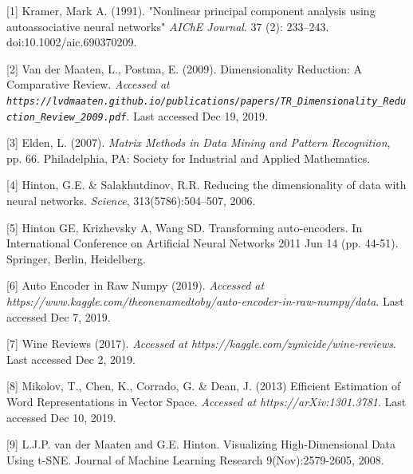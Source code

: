 \documentclass{article}
\begin{document}
[1] Kramer, Mark A. (1991). "Nonlinear principal component analysis using autoassociative neural networks" {\it AIChE Journal}. 37 (2): 233–243. doi:10.1002/aic.690370209.

[2] Van der Maaten, L., Postma, E. (2009). Dimensionality Reduction: A Comparative Review. {\it Accessed at \verb+https://lvdmaaten.github.io/publications/papers/TR_Dimensionality_Reduction_Review_2009.pdf+}. Last accessed Dec 19, 2019.

[3] Elden, L. (2007). {\it Matrix Methods in Data Mining and Pattern Recognition}, pp. 66. Philadelphia, PA:  Society for Industrial and Applied Mathematics.

[4] Hinton, G.E. \& Salakhutdinov, R.R. Reducing the dimensionality of data with neural networks. {\it Science}, 313(5786):504–507, 2006.

[5] Hinton GE, Krizhevsky A, Wang SD. Transforming auto-encoders. In International Conference on Artificial Neural Networks 2011 Jun 14 (pp. 44-51). Springer, Berlin, Heidelberg.

[6] Auto Encoder in Raw Numpy (2019). {\it Accessed at https://www.kaggle.com/theonenamedtoby/auto-encoder-in-raw-numpy/data}. Last accessed Dec 7, 2019.

[7] Wine Reviews (2017). {\it Accessed at https://kaggle.com/zynicide/wine-reviews}. Last accessed Dec 2, 2019.

[8] Mikolov, T., Chen, K., Corrado, G. \& Dean, J. (2013) Efficient Estimation of Word Representations in Vector Space. {\it Accessed at https://arXiv:1301.3781}. Last accessed Dec 10, 2019.

[9] L.J.P. van der Maaten and G.E. Hinton. Visualizing High-Dimensional Data Using t-SNE. Journal of Machine Learning Research 9(Nov):2579-2605, 2008.
\end{document}
